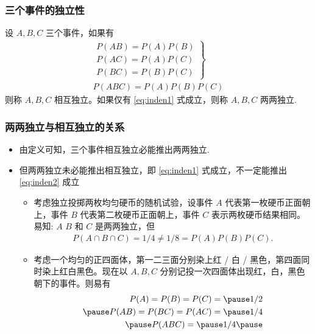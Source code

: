    \begin{frame}
	\frametitle{三个事件的独立性}
	\begin{defi}
		设 $A,B,C$ 三个事件，如果有
		\begin{eqnarray}\label{eq:inden1}
			\left.\begin{array}{l}
				P(AB)=P(A)P(B)\\
				P(AC)=P(A)P(C) \\
				P(BC)=P(B)P(C)
			\end{array}\right\}\\
			\label{eq:inden2}
			P(ABC)=P(A)P(B)P(C)
		\end{eqnarray}
		则称 $A,B,C$ 相互独立。如果仅有 \eqref{eq:inden1} 式成立，则称 $A,B,C$ 两两独立.
	\end{defi}
\end{frame}

\begin{frame}
	\frametitle{两两独立与相互独立的关系}
	\begin{itemize}[<+-|alert@+>]
		\item 由定义可知，三个事件相互独立必能推出两两独立.
		\item 但两两独立未必能推出相互独立，即 \eqref{eq:inden1} 式成立，不一定能推出 \eqref{eq:inden2} 成立
		\begin{itemize}
			\item 考虑独立投掷两枚均匀硬币的随机试验，设事件 $A$ 代表第一枚硬币正面朝上，事件 $B$ 代表第二枚硬币正面朝上，事件 $C$ 表示两枚硬币结果相同。易知: \pause
			$A$ $B$ 和 $C$ 是两两独立，但
			\begin{align*}
				P(A\cap B\cap C)=1/4\neq 1/8=P(A)P(B)P(C).
			\end{align*}
			\item 考虑一个均匀的正四面体，第一二三面分别染上红 / 白 / 黑色，第四面同时染上红白黑色。现在以 $A,B,C$ 分别记投一次四面体出现红，白，黑色朝下的事件。则易有 \pause
			\begin{eqnarray*}
				P(A)=P(B)=P(C)=\pause 1/2\\ \pause
				P(AB)=P(BC)=P(AC)=\pause 1/4\\ \pause
				P(ABC)=\pause 1/4    \pause
			\end{eqnarray*}
		\end{itemize}\vspace{-0.7cm}
	\end{itemize}
\end{frame}

